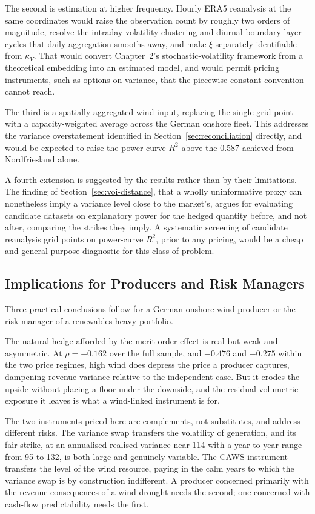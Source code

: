 \documentclass[11pt, a4paper, twoside]{article}
\begin{document}
The second is estimation at higher frequency. Hourly ERA5 reanalysis at the same coordinates would raise the observation count by roughly two orders of magnitude, resolve the intraday volatility clustering and diurnal boundary-layer cycles that daily aggregation smooths away, and make $\xi$ separately identifiable from $\kappa_V$. That would convert Chapter~2's stochastic-volatility framework from a theoretical embedding into an estimated model, and would permit pricing instruments, such as options on variance, that the piecewise-constant convention cannot reach.

The third is a spatially aggregated wind input, replacing the single grid point with a capacity-weighted average across the German onshore fleet. This addresses the variance overstatement identified in Section~\ref{sec:reconciliation} directly, and would be expected to raise the power-curve $R^2$ above the 0.587 achieved from Nordfriesland alone.

A fourth extension is suggested by the results rather than by their limitations. The finding of Section~\ref{sec:voi-distance}, that a wholly uninformative proxy can nonetheless imply a variance level close to the market's, argues for evaluating candidate datasets on explanatory power for the hedged quantity before, and not after, comparing the strikes they imply. A systematic screening of candidate reanalysis grid points on power-curve $R^2$, prior to any pricing, would be a cheap and general-purpose diagnostic for this class of problem.

\subsection{Implications for Producers and Risk Managers}
\label{sec:concl-implications}

Three practical conclusions follow for a German onshore wind producer or the risk manager of a renewables-heavy portfolio.

The natural hedge afforded by the merit-order effect is real but weak and asymmetric. At $\rho = -0.162$ over the full sample, and $-0.476$ and $-0.275$ within the two price regimes, high wind does depress the price a producer captures, dampening revenue variance relative to the independent case. But it erodes the upside without placing a floor under the downside, and the residual volumetric exposure it leaves is what a wind-linked instrument is for.

The two instruments priced here are complements, not substitutes, and address different risks. The variance swap transfers the volatility of generation, and its fair strike, at an annualised realised variance near 114 with a year-to-year range from 95 to 132, is both large and genuinely variable. The CAWS instrument transfers the level of the wind resource, paying in the calm years to which the variance swap is by construction indifferent. A producer concerned primarily with the revenue consequences of a wind drought needs the second; one concerned with cash-flow predictability needs the first.
\end{document}
